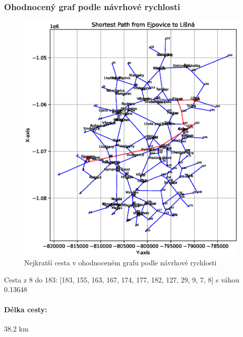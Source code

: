 \subsubsection*{Ohodnocený graf podle návrhové rychlosti}
\begin{figure}[H]
    \centering
    \includegraphics[width=\textwidth]{images/Ejpovice_speed_weight.eps}
    \caption{Nejkratší cesta v ohodnoceném grafu podle návrhové rychlosti}
\end{figure}
Cesta z 8 do 183: [183, 155, 163, 167, 174, 177, 182, 127, 29, 9, 7, 8] s váhou 0.13648
\paragraph{Délka cesty:} 38,2 km
